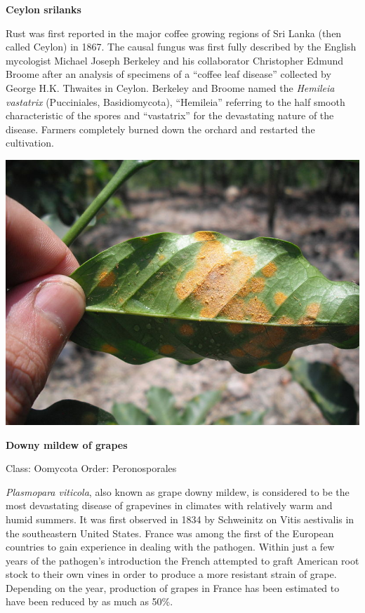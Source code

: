 \documentclass[
  openany]{book}
\begin{document}
\textbf{Ceylon srilanks}

Rust was first reported in the major coffee growing regions of Sri Lanka (then called Ceylon) in 1867. The causal fungus was first fully described by the English mycologist Michael Joseph Berkeley and his collaborator Christopher Edmund Broome after an analysis of specimens of a ``coffee leaf disease'' collected by George H.K. Thwaites in Ceylon. Berkeley and Broome named the \emph{Hemileia vastatrix} (Pucciniales, Basidiomycota), ``Hemileia'' referring to the half smooth characteristic of the spores and ``vastatrix'' for the devastating nature of the disease. Farmers completely burned down the orchard and restarted the cultivation.

\begin{center}\includegraphics[width=0.8\linewidth]{./images/hemileia_vastatrix_coffee_leaf_rust} \end{center}

\textbf{Downy mildew of grapes}

Class: Oomycota
Order: Peronosporales

\emph{Plasmopara viticola}, also known as grape downy mildew, is considered to be the most devastating disease of grapevines in climates with relatively warm and humid summers. It was first observed in 1834 by Schweinitz on Vitis aestivalis in the southeastern United States. France was among the first of the European countries to gain experience in dealing with the pathogen. Within just a few years of the pathogen's introduction the French attempted to graft American root stock to their own vines in order to produce a more resistant strain of grape. Depending on the year, production of grapes in France has been estimated to have been reduced by as much as 50\%.
\end{document}
